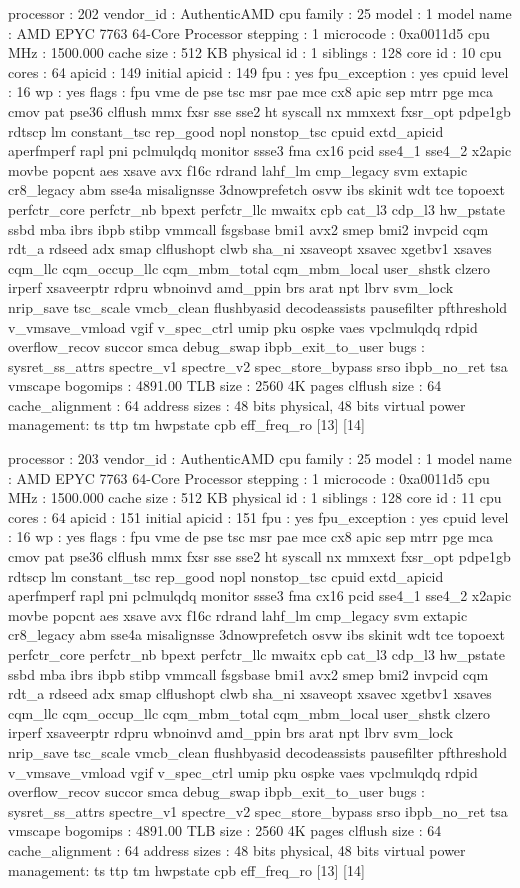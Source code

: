 processor	: 202
vendor_id	: AuthenticAMD
cpu family	: 25
model		: 1
model name	: AMD EPYC 7763 64-Core Processor
stepping	: 1
microcode	: 0xa0011d5
cpu MHz		: 1500.000
cache size	: 512 KB
physical id	: 1
siblings	: 128
core id		: 10
cpu cores	: 64
apicid		: 149
initial apicid	: 149
fpu		: yes
fpu_exception	: yes
cpuid level	: 16
wp		: yes
flags		: fpu vme de pse tsc msr pae mce cx8 apic sep mtrr pge mca cmov pat pse36 clflush mmx fxsr sse sse2 ht syscall nx mmxext fxsr_opt pdpe1gb rdtscp lm constant_tsc rep_good nopl nonstop_tsc cpuid extd_apicid aperfmperf rapl pni pclmulqdq monitor ssse3 fma cx16 pcid sse4_1 sse4_2 x2apic movbe popcnt aes xsave avx f16c rdrand lahf_lm cmp_legacy svm extapic cr8_legacy abm sse4a misalignsse 3dnowprefetch osvw ibs skinit wdt tce topoext perfctr_core perfctr_nb bpext perfctr_llc mwaitx cpb cat_l3 cdp_l3 hw_pstate ssbd mba ibrs ibpb stibp vmmcall fsgsbase bmi1 avx2 smep bmi2 invpcid cqm rdt_a rdseed adx smap clflushopt clwb sha_ni xsaveopt xsavec xgetbv1 xsaves cqm_llc cqm_occup_llc cqm_mbm_total cqm_mbm_local user_shstk clzero irperf xsaveerptr rdpru wbnoinvd amd_ppin brs arat npt lbrv svm_lock nrip_save tsc_scale vmcb_clean flushbyasid decodeassists pausefilter pfthreshold v_vmsave_vmload vgif v_spec_ctrl umip pku ospke vaes vpclmulqdq rdpid overflow_recov succor smca debug_swap ibpb_exit_to_user
bugs		: sysret_ss_attrs spectre_v1 spectre_v2 spec_store_bypass srso ibpb_no_ret tsa vmscape
bogomips	: 4891.00
TLB size	: 2560 4K pages
clflush size	: 64
cache_alignment	: 64
address sizes	: 48 bits physical, 48 bits virtual
power management: ts ttp tm hwpstate cpb eff_freq_ro [13] [14]

processor	: 203
vendor_id	: AuthenticAMD
cpu family	: 25
model		: 1
model name	: AMD EPYC 7763 64-Core Processor
stepping	: 1
microcode	: 0xa0011d5
cpu MHz		: 1500.000
cache size	: 512 KB
physical id	: 1
siblings	: 128
core id		: 11
cpu cores	: 64
apicid		: 151
initial apicid	: 151
fpu		: yes
fpu_exception	: yes
cpuid level	: 16
wp		: yes
flags		: fpu vme de pse tsc msr pae mce cx8 apic sep mtrr pge mca cmov pat pse36 clflush mmx fxsr sse sse2 ht syscall nx mmxext fxsr_opt pdpe1gb rdtscp lm constant_tsc rep_good nopl nonstop_tsc cpuid extd_apicid aperfmperf rapl pni pclmulqdq monitor ssse3 fma cx16 pcid sse4_1 sse4_2 x2apic movbe popcnt aes xsave avx f16c rdrand lahf_lm cmp_legacy svm extapic cr8_legacy abm sse4a misalignsse 3dnowprefetch osvw ibs skinit wdt tce topoext perfctr_core perfctr_nb bpext perfctr_llc mwaitx cpb cat_l3 cdp_l3 hw_pstate ssbd mba ibrs ibpb stibp vmmcall fsgsbase bmi1 avx2 smep bmi2 invpcid cqm rdt_a rdseed adx smap clflushopt clwb sha_ni xsaveopt xsavec xgetbv1 xsaves cqm_llc cqm_occup_llc cqm_mbm_total cqm_mbm_local user_shstk clzero irperf xsaveerptr rdpru wbnoinvd amd_ppin brs arat npt lbrv svm_lock nrip_save tsc_scale vmcb_clean flushbyasid decodeassists pausefilter pfthreshold v_vmsave_vmload vgif v_spec_ctrl umip pku ospke vaes vpclmulqdq rdpid overflow_recov succor smca debug_swap ibpb_exit_to_user
bugs		: sysret_ss_attrs spectre_v1 spectre_v2 spec_store_bypass srso ibpb_no_ret tsa vmscape
bogomips	: 4891.00
TLB size	: 2560 4K pages
clflush size	: 64
cache_alignment	: 64
address sizes	: 48 bits physical, 48 bits virtual
power management: ts ttp tm hwpstate cpb eff_freq_ro [13] [14]

